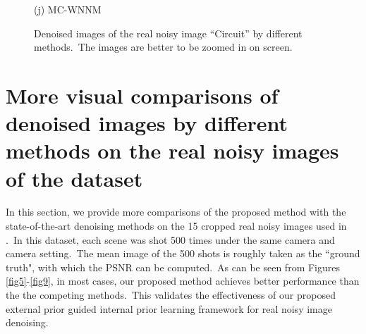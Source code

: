 \documentclass[10pt,onecolumn,letterpaper]{article}
\begin{document}
\begin{figure}
{\begin{minipage}[t]{0.2\textwidth}
{\footnotesize (j) MC-WNNM  }
\end{minipage}
}
\vspace{-2mm}
\caption{Denoised images of the real noisy image ``Circuit'' \cite{ncwebsite} by different methods.\ The images are better to be zoomed in on screen.}
\label{f3}
\vspace{-2mm}
\end{figure}






\section{More visual comparisons of denoised images by different methods on the real noisy images of the dataset \cite{crosschannel2016}}

In this section, we provide more comparisons of the proposed method with the state-of-the-art denoising methods on the 15 cropped real noisy images used in \cite{crosschannel2016}.\ In this dataset, each scene was shot 500 times under the same camera and camera setting.\ The mean image of the 500 shots is roughly taken as the ``ground truth", with which the PSNR can be computed.\ As can be seen from Figures \ref{fig5}-\ref{fig9}, in most cases, our proposed method achieves better performance than the the competing methods.\ This validates the effectiveness of our proposed external prior guided internal prior learning framework for real noisy image denoising.
\end{document}
